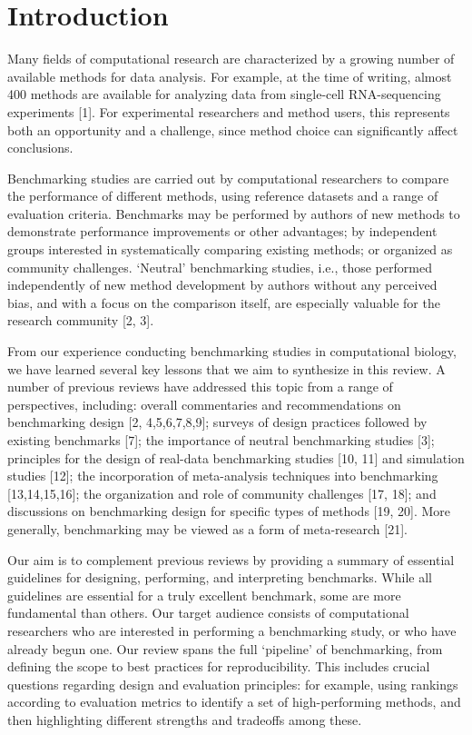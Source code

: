 \section{Introduction}

Many fields of computational research are characterized by a growing number of available methods for data analysis. For example, at the time of writing, almost 400 methods are available for analyzing data from single-cell RNA-sequencing experiments [1]. For experimental researchers and method users, this represents both an opportunity and a challenge, since method choice can significantly affect conclusions.

Benchmarking studies are carried out by computational researchers to compare the performance of different methods, using reference datasets and a range of evaluation criteria. Benchmarks may be performed by authors of new methods to demonstrate performance improvements or other advantages; by independent groups interested in systematically comparing existing methods; or organized as community challenges. ‘Neutral’ benchmarking studies, i.e., those performed independently of new method development by authors without any perceived bias, and with a focus on the comparison itself, are especially valuable for the research community [2, 3].

From our experience conducting benchmarking studies in computational biology, we have learned several key lessons that we aim to synthesize in this review. A number of previous reviews have addressed this topic from a range of perspectives, including: overall commentaries and recommendations on benchmarking design [2, 4,5,6,7,8,9]; surveys of design practices followed by existing benchmarks [7]; the importance of neutral benchmarking studies [3]; principles for the design of real-data benchmarking studies [10, 11] and simulation studies [12]; the incorporation of meta-analysis techniques into benchmarking [13,14,15,16]; the organization and role of community challenges [17, 18]; and discussions on benchmarking design for specific types of methods [19, 20]. More generally, benchmarking may be viewed as a form of meta-research [21].

Our aim is to complement previous reviews by providing a summary of essential guidelines for designing, performing, and interpreting benchmarks. While all guidelines are essential for a truly excellent benchmark, some are more fundamental than others. Our target audience consists of computational researchers who are interested in performing a benchmarking study, or who have already begun one. Our review spans the full ‘pipeline’ of benchmarking, from defining the scope to best practices for reproducibility. This includes crucial questions regarding design and evaluation principles: for example, using rankings according to evaluation metrics to identify a set of high-performing methods, and then highlighting different strengths and tradeoffs among these.

